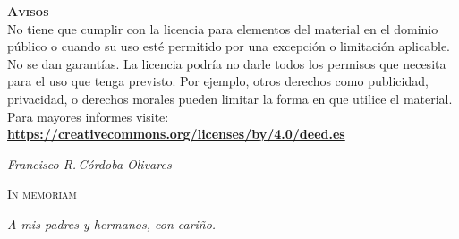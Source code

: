 \documentclass[14pt,twoside,final]{extbook} %
\begin{document}
\begin{scriptsize}
\begin{flushleft}
\begin{minipage}{7.5cm}
\noindent \textbf{\textsc{Avisos}} \\

\noindent No tiene que cumplir con la licencia para elementos del material en el dominio público o cuando su uso esté permitido por una excepción o limitación aplicable. \\

\noindent No se dan garantías. La licencia podría no darle todos los permisos que necesita para el uso que tenga previsto. Por ejemplo, otros derechos como publicidad, privacidad, o derechos morales pueden limitar la forma en que utilice el material. \\

\noindent Para mayores informes visite: \\ 

\textbf{\url{https://creativecommons.org/licenses/by/4.0/deed.es}}
\end{minipage}
\end{flushleft}
\end{scriptsize}
\newpage
\pagestyle{empty}
\vspace*{42pt}
\begin{flushright}
\textit{Francisco R.\,Córdoba Olivares}
\end{flushright}
\begin{flushright}
\textsc{In memoriam}
\vspace*{28pt}
\end{flushright}
\begin{flushright}
\textit{A mis padres y hermanos, con cariño.}
\end{flushright}
\newpage
\pagestyle{empty}
\newpage
\pagestyle{empty}
\end{document}
